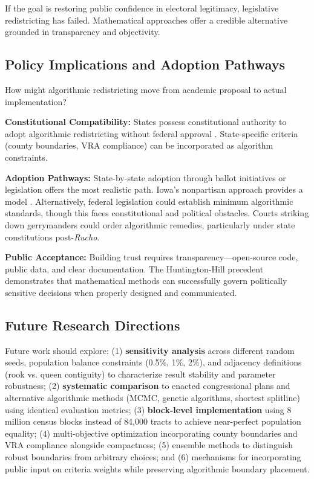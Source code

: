 If the goal is restoring public confidence in electoral legitimacy, legislative redistricting has failed. Mathematical approaches offer a credible alternative grounded in transparency and objectivity.
\subsection{Policy Implications and Adoption Pathways}

How might algorithmic redistricting move from academic proposal to actual implementation?

\textbf{Constitutional Compatibility:} States possess constitutional authority to adopt algorithmic redistricting without federal approval \cite{baker1962}. State-specific criteria (county boundaries, VRA compliance) can be incorporated as algorithm constraints.

\textbf{Adoption Pathways:} State-by-state adoption through ballot initiatives or legislation offers the most realistic path. Iowa's nonpartisan approach provides a model \cite{deford2019implementing}. Alternatively, federal legislation could establish minimum algorithmic standards, though this faces constitutional and political obstacles. Courts striking down gerrymanders could order algorithmic remedies, particularly under state constitutions post-\textit{Rucho}.

\textbf{Public Acceptance:} Building trust requires transparency—open-source code, public data, and clear documentation. The Huntington-Hill precedent demonstrates that mathematical methods can successfully govern politically sensitive decisions when properly designed and communicated.
\subsection{Future Research Directions}

Future work should explore: (1) \textbf{sensitivity analysis} across different random seeds, population balance constraints (0.5\%, 1\%, 2\%), and adjacency definitions (rook vs. queen contiguity) to characterize result stability and parameter robustness; (2) \textbf{systematic comparison} to enacted congressional plans and alternative algorithmic methods (MCMC, genetic algorithms, shortest splitline) using identical evaluation metrics; (3) \textbf{block-level implementation} using 8 million census blocks instead of 84,000 tracts to achieve near-perfect population equality; (4) multi-objective optimization incorporating county boundaries and VRA compliance alongside compactness; (5) ensemble methods \cite{fifield2020automated} to distinguish robust boundaries from arbitrary choices; and (6) mechanisms for incorporating public input on criteria weights while preserving algorithmic boundary placement.
